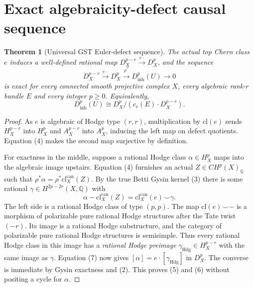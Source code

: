 \documentclass[11pt]{article}
\newtheorem{theorem}{Theorem}
\begin{document}
\section{Exact algebraicity-defect causal sequence}
\begin{theorem}[Universal GST Euler-defect sequence]\label{thm:defect}
The actual top Chern class $e$ induces a well-defined rational map
$D_X^{p-r}\xrightarrow{e\cdot}D_X^p$, and the sequence
\[
 \boxed{
 D_X^{p-r}\xrightarrow{e\cdot}D_X^p
 \xrightarrow{\rho^*}D_{\mathrm{inh}}^p(U)
 \longrightarrow0
 }                                                          \tag{5}
\]
is exact for every connected smooth projective complex $X$,
every algebraic rank-$r$ bundle $E$ and every integer $p\ge0$.
Equivalently,
\[
 \boxed{D_{\mathrm{inh}}^p(U)\cong
              D_X^p/(c_r(E)\cdot D_X^{p-r}).}                \tag{6}
\]
\end{theorem}
\begin{proof}
As $e$ is algebraic of Hodge type $(r,r)$, multiplication by
$\mathrm{cl}(e)$ sends $H_X^{p-r}$ into $H_X^p$ and
$A_X^{p-r}$ into $A_X^p$, inducing the left map on defect quotients.
Equation (4) makes the second map surjective by definition.

For exactness in the middle, suppose a rational Hodge class
$\alpha\in H_X^p$ maps into the algebraic image upstairs.
Equation (4) furnishes an actual $Z\in CH^p(X)_{\mathbb Q}$
such that
$\rho^*\alpha=\rho^*\mathrm{cl}^{\mathrm{can}}_X(Z)$.
By the true Betti Gysin kernel (3) there is some rational
$\gamma\in H^{2p-2r}(X,\mathbb Q)$ with
\[
 \alpha-\mathrm{cl}^{\mathrm{can}}_X(Z)
         =\mathrm{cl}^{\mathrm{can}}_X(e)\smile\gamma.       \tag{7}
\]
The left side is a rational Hodge class of type $(p,p)$.
The map $\mathrm{cl}(e)\smile-$ is a morphism of polarizable
pure rational Hodge structures after the Tate twist $(-r)$.
Its image is a rational Hodge substructure, and the category of
polarizable pure rational Hodge structures is semisimple.
Thus every rational Hodge class in this image has a
\emph{rational Hodge preimage}
$\gamma_{\mathrm{Hdg}}\in H_X^{p-r}$ with the same image
as $\gamma$. Equation (7) now gives
$[\alpha]=e\cdot[\gamma_{\mathrm{Hdg}}]$ in $D_X^p$.
The converse is immediate by Gysin exactness and (2).
This proves (5) and (6) without positing a cycle for $\alpha$.
\end{proof}
\end{document}
